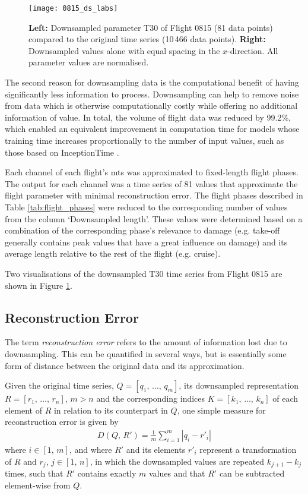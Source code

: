 \begin{figure}[tb!]
    \centering
    \texttt{[image: 0815\_ds\_labs]}
    \caption{\label{fig:0815_ds} \textbf{Left:} Downsampled parameter T30 of Flight 0815 (81 data points) compared to the original time series (10\,466 data points). \textbf{Right:} Downsampled values alone with equal spacing in the \(x\)-direction. All parameter values are normalised.}
\end{figure}

The second reason for downsampling data is the computational benefit of having significantly less information to process. Downsampling can help to remove noise from data which is otherwise computationally costly while offering no additional information of value. In total, the volume of flight data was reduced by 99.2\%, which enabled an equivalent improvement in computation time for models whose training time increases proportionally to the number of input values, such as those based on InceptionTime \cite[]{fawaz_inceptiontime_2019}.

Each channel of each flight's \ac{mts} was approximated to fixed-length flight phases. The output for each channel was a time series of 81 values that approximate the flight parameter with minimal reconstruction error. The flight phases described in Table \ref{tab:flight_phases} were reduced to the corresponding number of values from the column `Downsampled length'. These values were determined based on a combination of the corresponding phase's relevance to damage (e.g. take-off generally contains peak values that have a great influence on damage) and its average length relative to the rest of the flight (e.g. cruise).

Two visualisations of the downsampled T30 time series from Flight 0815 are shown in Figure \ref{fig:0815_ds}.

\subsection{Reconstruction Error} \label{sec:recon_err}
The term \textit{reconstruction error} refers to the amount of information lost due to downsampling. This can be quantified in several ways, but is essentially some form of distance between the original data and its approximation.

Given the original time series, \(Q = \left[q_1,\,\ldots,\,q_m\right]\), its downsampled representation \(R = \left[r_1,\,\ldots,\,r_n\right]\), \(m > n\) and the corresponding indices \(K = \left[k_1,\,\ldots,\,k_n\right]\) of each element of \(R\) in relation to its counterpart in \(Q\), one simple measure for reconstruction error is given by
\begin{align} \label{eq:recon_err}
    D(Q,\,R') = \frac{1}{m}\sum_{i=1}^{m}{\left|q_i - r'_i\right|}
\end{align}
where \(i \in \left[1,\,m\right]\), and where \(R'\) and its elements \(r'_i\) represent a transformation of \(R\) and \(r_j\), \(j \in \left[1,\,n\right]\), in which the downsampled values are repeated \(k_{j + 1} - k_j\) times, such that \(R'\) contains exactly \(m\) values and that \(R'\) can be subtracted element-wise from \(Q\).

